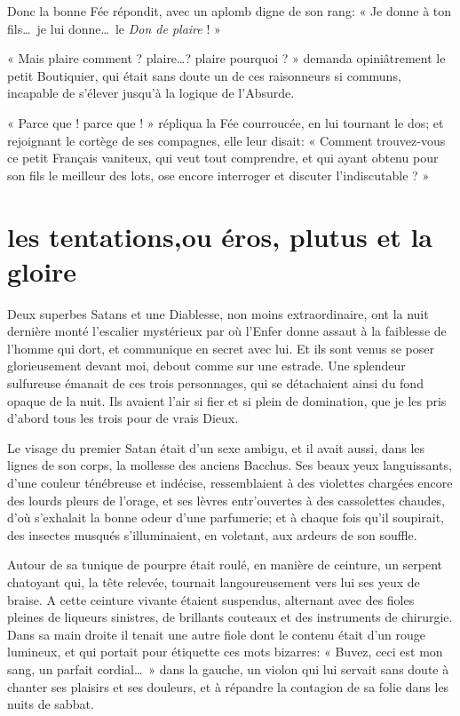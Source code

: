 Donc la bonne Fée répondit, avec un aplomb digne de son rang: « Je donne
à ton fils\ldots\ je lui donne\ldots\ le \textit{Don de plaire} ! »

« Mais plaire comment ? plaire\ldots ? plaire pourquoi ? » demanda
opiniâtrement le petit Boutiquier, qui était sans doute un de ces
raisonneurs si communs, incapable de s’élever
jusqu’à la logique de l’Absurde.

« Parce que ! parce que ! » répliqua la Fée courroucée, en lui tournant
le dos; et rejoignant le cortège de ses compagnes, elle leur disait: «
Comment trouvez{}-vous ce petit Français vaniteux, qui veut tout
comprendre, et qui ayant obtenu pour son fils le meilleur des lots, ose 
encore interroger et discuter l’indiscutable ? »

\quebra\section[Les tentations, ou éros, plutus et la gloire]{les tentations,\break ou éros, plutus et la gloire }

Deux superbes Satans et une Diablesse, non moins extraordinaire, ont la
nuit dernière monté l’escalier mystérieux par où
l’Enfer donne assaut à la faiblesse de
l’homme qui dort, et communique en secret avec lui. Et
ils sont venus se poser glorieusement devant moi, debout comme sur une
estrade. Une splendeur sulfureuse émanait de ces trois personnages, qui
se détachaient ainsi du fond opaque de la nuit. Ils avaient
l’air si fier et si plein de domination, que je les
pris d’abord tous les trois pour de vrais Dieux.

Le visage du premier Satan était d’un sexe ambigu, et
il avait aussi, dans les lignes de son corps, la mollesse des anciens
Bacchus. Ses beaux yeux languissants, d’une couleur
ténébreuse et indécise, ressemblaient à des violettes chargées encore
des lourds pleurs de l’orage, et ses lèvres
entr’ouvertes à des cassolettes chaudes,
d’où s’exhalait la bonne odeur
d’une parfumerie; et à chaque fois
qu’il soupirait, des insectes musqués
s’illuminaient, en voletant, aux ardeurs de son
souffle.

Autour de sa tunique de pourpre était roulé, en manière de ceinture, un
serpent chatoyant qui, la tête relevée, tournait langoureusement vers
lui ses yeux de braise. A cette ceinture vivante étaient suspendus,
alternant avec des fioles pleines de liqueurs sinistres, de brillants
couteaux et des instruments de chirurgie. Dans sa main droite il tenait
une autre fiole dont le contenu était d’un rouge
lumineux, et qui portait pour étiquette ces mots bizarres: « Buvez,
ceci est mon sang, un parfait cordial\ldots\ » dans la gauche, un violon qui
lui servait sans doute à chanter ses plaisirs et ses douleurs, et à
répandre la contagion de sa folie dans les nuits de sabbat.

